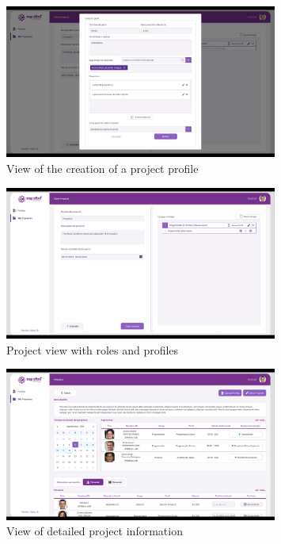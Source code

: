 \documentclass{scrreprt}
\begin{document}
\begin{figure}[H]
	\centering \small
	\includegraphics[width=0.8\textwidth]{WebPrototype/wflow-11.jpeg}
	\caption{View of the creation of a project profile}
\end{figure}


\begin{figure}[H]
	\centering \small
	\includegraphics[width=0.8\textwidth]{WebPrototype/wflow-12.jpeg}
	\caption{Project view with roles and profiles}
\end{figure}

\begin{figure}[H]
	\centering \small
	\includegraphics[width=0.8\textwidth]{WebPrototype/wflow-13.jpeg}
	\caption{View of detailed project information}
\end{figure}
\end{document}
